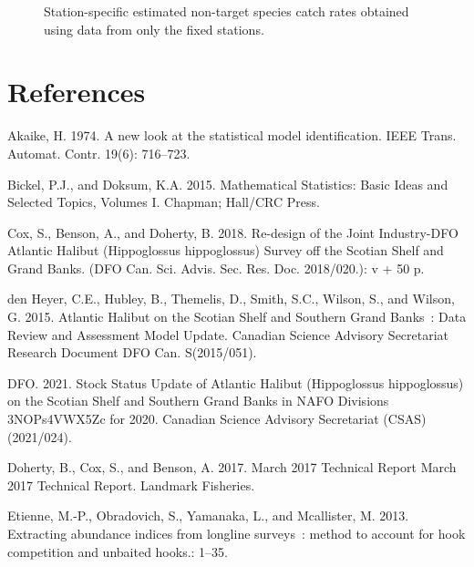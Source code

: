 \documentclass[12pt]{article}\usepackage[]{graphicx}\usepackage[]{color}
\begin{document}
\begin{appendices}
\begin{figure}[htb]
{}

\caption{Station-specific estimated non-target species catch rates obtained using data from only the fixed stations.}\label{fig:non-target-spat-fixed}
\end{figure}
\end{appendices}

\clearpage

\hypertarget{references}{%
\section{References}\label{references}}

\noindent \vspace{-2em} \setlength{\parindent}{-0.2in} \setlength{\leftskip}{0.2in} \setlength{\parskip}{8pt}

\hypertarget{refs}{}
\leavevmode\hypertarget{ref-Akaike1974}{}%
Akaike, H. 1974. A new look at the statistical model identification. IEEE Trans. Automat. Contr. 19(6): 716--723.

\leavevmode\hypertarget{ref-Bickel2015}{}%
Bickel, P.J., and Doksum, K.A. 2015. Mathematical Statistics: Basic Ideas and Selected Topics, Volumes I. Chapman; Hall/CRC Press.

\leavevmode\hypertarget{ref-Cox2018}{}%
Cox, S., Benson, A., and Doherty, B. 2018. Re-design of the Joint Industry-DFO Atlantic Halibut (Hippoglossus hippoglossus) Survey off the Scotian Shelf and Grand Banks. (DFO Can. Sci. Advis. Sec. Res. Doc. 2018/020.): v + 50 p.

\leavevmode\hypertarget{ref-DenHeyer2015}{}%
den Heyer, C.E., Hubley, B., Themelis, D., Smith, S.C., Wilson, S., and Wilson, G. 2015. Atlantic Halibut on the Scotian Shelf and Southern Grand Banks~: Data Review and Assessment Model Update. Canadian Science Advisory Secretariat Research Document DFO Can. S(2015/051).

\leavevmode\hypertarget{ref-DFO2021}{}%
DFO. 2021. Stock Status Update of Atlantic Halibut (Hippoglossus hippoglossus) on the Scotian Shelf and Southern Grand Banks in NAFO Divisions 3NOPs4VWX5Zc for 2020. Canadian Science Advisory Secretariat (CSAS) (2021/024).

\leavevmode\hypertarget{ref-Doherty2017}{}%
Doherty, B., Cox, S., and Benson, A. 2017. March 2017 Technical Report March 2017 Technical Report. Landmark Fisheries.

\leavevmode\hypertarget{ref-Etienne2013}{}%
Etienne, M.-P., Obradovich, S., Yamanaka, L., and Mcallister, M. 2013. Extracting abundance indices from longline surveys~: method to account for hook competition and unbaited hooks.: 1--35.
\end{document}
